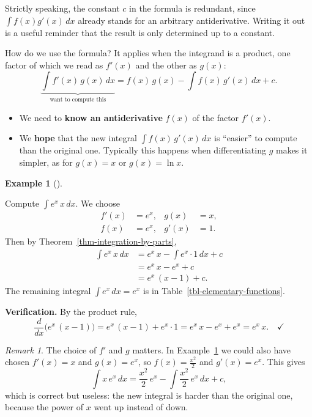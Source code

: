 \documentclass[
  letterpaper,
  DIV=11,
  numbers=noendperiod]{scrreprt}
\providecommand{\tightlist}{%
  \setlength{\itemsep}{0pt}\setlength{\parskip}{0pt}}
\theoremstyle{plain}
\theoremstyle{plain}
\theoremstyle{definition}
\theoremstyle{definition}
\theoremstyle{definition}
\newtheorem{example}{Example}[chapter]
\theoremstyle{plain}
\theoremstyle{plain}
\theoremstyle{remark}
\newtheorem{refremark}{Remark}[chapter]
\begin{document}
Strictly speaking, the constant \(c\) in the formula is redundant, since
\(\int f(x)g'(x)\,dx\) already stands for an arbitrary antiderivative.
Writing it out is a useful reminder that the result is only determined
up to a constant.

How do we use the formula? It applies when the integrand is a product,
one factor of which we read as \(f'(x)\) and the other as \(g(x)\): \[
\underbrace{\int f'(x)\,g(x)\,dx}_{\text{want to compute this}}
= f(x)\,g(x) - \int f(x)\,g'(x)\,dx + c .
\]

\begin{itemize}
\tightlist
\item
  We need to \textbf{know an antiderivative} \(f(x)\) of the factor
  \(f'(x)\).
\item
  We \textbf{hope} that the new integral \(\int f(x)\,g'(x)\,dx\) is
  ``easier'' to compute than the original one. Typically this happens
  when differentiating \(g\) makes it simpler, as for \(g(x)=x\) or
  \(g(x)=\ln x\).
\end{itemize}

\begin{example}[]\protect\hypertarget{exm-parts-x-ex}{}\label{exm-parts-x-ex}

\hfill\break
Compute \(\int e^x\,x\,dx\). We choose \[
\begin{aligned}
f'(x) &= e^x, & g(x) &= x, \\
f(x) &= e^x, & g'(x) &= 1 .
\end{aligned}
\] Then by Theorem~\ref{thm-integration-by-parts}, \[
\begin{aligned}
\int e^x\,x\,dx &= e^x\,x - \int e^x\cdot 1\,dx + c \\
&= e^x\,x - e^x + c \\
&= e^x\,(x-1) + c .
\end{aligned}
\] The remaining integral \(\int e^x\,dx = e^x\) is in
Table~\ref{tbl-elementary-functions}.

\textbf{Verification.} By the product rule, \[
\frac{d}{dx}\Big(e^x\,(x-1)\Big) = e^x\,(x-1) + e^x\cdot 1 = e^x\,x - e^x + e^x = e^x\,x . \quad\checkmark
\]

\end{example}

\begin{refremark}
The choice of \(f'\) and \(g\) matters. In Example~\ref{exm-parts-x-ex}
we could also have chosen \(f'(x)=x\) and \(g(x)=e^x\), so
\(f(x)=\frac{x^2}{2}\) and \(g'(x)=e^x\). This gives \[
\int x\,e^x\,dx = \frac{x^2}{2}\,e^x - \int \frac{x^2}{2}\,e^x\,dx + c ,
\] which is correct but useless: the new integral is harder than the
original one, because the power of \(x\) went up instead of down.

\label{rem-parts-choice}

\end{refremark}
\end{document}
